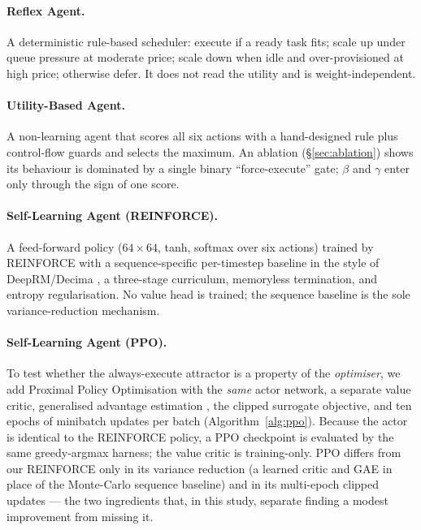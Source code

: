 \documentclass[10pt,twocolumn]{article}
\begin{document}
\paragraph{Reflex Agent.} A deterministic rule-based scheduler: execute if a
ready task fits; scale up under queue pressure at moderate price; scale down when
idle and over-provisioned at high price; otherwise defer. It does not read the
utility and is weight-independent.

\paragraph{Utility-Based Agent.} A non-learning agent that scores all six actions
with a hand-designed rule plus control-flow guards and selects the maximum. An
ablation (\S\ref{sec:ablation}) shows its behaviour is dominated by a single
binary ``force-execute'' gate; $\beta$ and $\gamma$ enter only through the sign
of one score.

\paragraph{Self-Learning Agent (REINFORCE).} A feed-forward policy
($64\times64$, tanh, softmax over six actions) trained by REINFORCE
\cite{williams1992} with a sequence-specific per-timestep baseline in the style
of DeepRM/Decima \cite{mao2016deeprm,mao2019variance}, a three-stage curriculum,
memoryless termination, and entropy regularisation. No value head is trained; the
sequence baseline is the sole variance-reduction mechanism.

\paragraph{Self-Learning Agent (PPO).} To test whether the always-execute
attractor is a property of the \emph{optimiser}, we add Proximal Policy
Optimisation \cite{schulman2017ppo} with the \emph{same} actor network, a
separate value critic, generalised advantage estimation \cite{schulman2016gae},
the clipped surrogate objective, and ten epochs of minibatch updates per batch
(Algorithm~\ref{alg:ppo}). Because the actor is identical to the REINFORCE
policy, a PPO checkpoint is evaluated by the same greedy-argmax harness; the
value critic is training-only. PPO differs from our REINFORCE only in its
variance reduction (a learned critic and GAE in place of the Monte-Carlo
sequence baseline) and in its multi-epoch clipped updates --- the two ingredients
that, in this study, separate finding a modest improvement from missing it.
\end{document}

